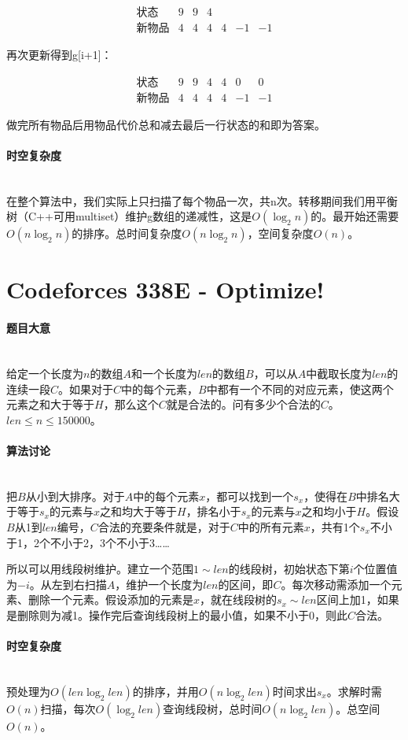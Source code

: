 \documentclass[UTF8]{ctexart}
\newcommand{\myparagraph}[1]{\paragraph{#1}\mbox{}\\}
\theoremstyle{nonumberplain}
\begin{document}
			$$\begin{array}{lcccccc}
				\mbox{状态} & 9 & 9 & 4 &  &  &  \\
				\mbox{新物品} & 4 & 4 & 4 & 4 & -1 & -1
			\end{array}$$
			
			再次更新得到g[i+1]：
			
			$$\begin{array}{lcccccc}
				\mbox{状态} & 9 & 9 & 4 & 4 & 0 & 0 \\
				\mbox{新物品} & 4 & 4 & 4 & 4 & -1 & -1
			\end{array}$$
			
			做完所有物品后用物品代价总和减去最后一行状态的和即为答案。
		
		\myparagraph{时空复杂度}
		
			在整个算法中，我们实际上只扫描了每个物品一次，共n次。转移期间我们用平衡树（C++可用multiset）维护g数组的递减性，这是$O(\log_2n)$的。最开始还需要$O(n\log_2n)$的排序。总时间复杂度$O(n\log_2n)$，空间复杂度$O(n)$。
	
	\section{Codeforces 338E - Optimize!}
	
		\myparagraph{题目大意}
		
			给定一个长度为$n$的数组$A$和一个长度为$len$的数组$B$，可以从$A$中截取长度为$len$的连续一段$C$。如果对于$C$中的每个元素，$B$中都有一个不同的对应元素，使这两个元素之和大于等于$H$，那么这个$C$就是合法的。问有多少个合法的$C$。$len \leq n \leq 150000$。
		
		\myparagraph{算法讨论}
		
			把$B$从小到大排序。对于$A$中的每个元素$x$，都可以找到一个$s_x$，使得在$B$中排名大于等于$s_x$的元素与$x$之和均大于等于$H$，排名小于$s_x$的元素与$x$之和均小于$H$。假设$B$从1到$len$编号，$C$合法的充要条件就是，对于$C$中的所有元素$x$，共有1个$s_x$不小于1，2个不小于2，3个不小于3……
			
			所以可以用线段树维护。建立一个范围$1 \sim len$的线段树，初始状态下第$i$个位置值为$-i$。从左到右扫描$A$，维护一个长度为$len$的区间，即$C$。每次移动需添加一个元素、删除一个元素。假设添加的元素是$x$，就在线段树的$s_x \sim len$区间上加1，如果是删除则为减1。操作完后查询线段树上的最小值，如果不小于0，则此$C$合法。
		
		\myparagraph{时空复杂度}
		
			预处理为$O(len\log_2len)$的排序，并用$O(n\log_2len)$时间求出$s_x$。求解时需$O(n)$扫描，每次$O(\log_2len)$查询线段树，总时间$O(n\log_2len)$。总空间$O(n)$。
	
\end{document}
